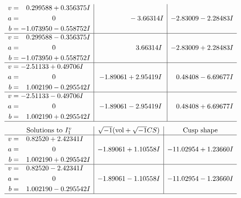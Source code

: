 \documentclass[1p]{elsarticle_modified}
\theoremstyle{definition}
\newcommand{\I}{\sqrt{-1}}
\begin{document}
$$\begin{array}{c|c|c}
\begin{aligned}
v &= \phantom{-}0.299588 + 0.356375 I \\
a &= \phantom{-0.000000 } 0 \\
b &= -1.073950 - 0.558752 I\end{aligned}
 & \phantom{-0.000000 } -3.66314 I & -2.83009 - 2.28483 I \\ \hline\begin{aligned}
v &= \phantom{-}0.299588 - 0.356375 I \\
a &= \phantom{-0.000000 } 0 \\
b &= -1.073950 + 0.558752 I\end{aligned}
 & \phantom{-0.000000 -}3.66314 I & -2.83009 + 2.28483 I \\ \hline\begin{aligned}
v &= -2.51133 + 0.49706 I \\
a &= \phantom{-0.000000 } 0 \\
b &= \phantom{-}1.002190 - 0.295542 I\end{aligned}
 & -1.89061 + 2.95419 I & \phantom{-}0.48408 - 6.69677 I \\ \hline\begin{aligned}
v &= -2.51133 - 0.49706 I \\
a &= \phantom{-0.000000 } 0 \\
b &= \phantom{-}1.002190 + 0.295542 I\end{aligned}
 & -1.89061 - 2.95419 I & \phantom{-}0.48408 + 6.69677 I\\
 \hline 
 \end{array}$$\newpage$$\begin{array}{c|c|c}  
\text{Solutions to }I^v_{1}& \I (\text{vol} + \sqrt{-1}CS) & \text{Cusp shape}\\
 \hline 
\begin{aligned}
v &= \phantom{-}0.82520 + 2.42341 I \\
a &= \phantom{-0.000000 } 0 \\
b &= \phantom{-}1.002190 + 0.295542 I\end{aligned}
 & -1.89061 + 1.10558 I & -11.02954 + 1.23660 I \\ \hline\begin{aligned}
v &= \phantom{-}0.82520 - 2.42341 I \\
a &= \phantom{-0.000000 } 0 \\
b &= \phantom{-}1.002190 - 0.295542 I\end{aligned}
 & -1.89061 - 1.10558 I & -11.02954 - 1.23660 I\\
 \hline 
 \end{array}$$\newpage
\end{document}
